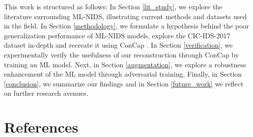 \documentclass[english]{article}
\begin{document}
	This work is structured as follows: In Section \ref{lit_study}, we explore the literature surrounding ML-NIDS, illustrating current methods and datasets used in the field. In Section \ref{methodology}, we formulate a hypothesis behind the poor generalization performance of ML-NIDS models, explore the CIC-IDS-2017 dataset in-depth and recreate it using ConCap \cite{concap}. In Section \ref{verification}, we experimentally verify the usefulness of our reconstruction through ConCap by training an ML model. Next, in Section \ref{augmentation}, we explore a robustness enhancement of the ML model through adversarial training. Finally, in Section \ref{conclusion}, we summarize our findings and in Section \ref{future_work} we reflect on further research avenues.
	
	\newpage
	
	
	\newpage
	
	
	\newpage
	
	
	\newpage
	
	
	\newpage
	
	
	\newpage
	
	
	\newpage
	\section{References}
	\printbibliography[heading=none]
	\newpage
	\appendix
	
\end{document}
